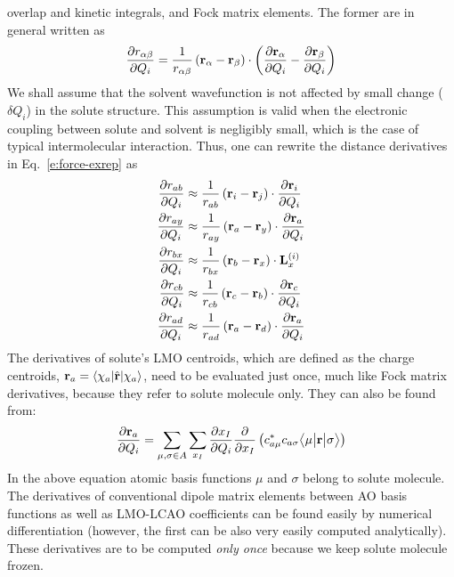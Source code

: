 \documentclass[b5paper,oneside,fleqn,11pt]{book}
\newcommand{\tbraket}[3]{\ensuremath{\bigl\langle {#1} \bigl\lvert {#2} \bigl\lvert {#3} \bigr\rangle}}
\newcommand{\fderiv}[2]{\ensuremath{
    \frac{\partial #1}{\partial #2}}}
\begin{document}
\begin{refsection}
overlap and kinetic integrals, and Fock matrix elements. The former 
are in general written as 
%
\begin{equation}\label{e:dr}
\fderiv{r_{\alpha\beta}}{Q_i} = 
\frac{1}{r_{\alpha\beta}} 
\left( {\bf r}_\alpha - {\bf r}_\beta \right) \cdot
\left( \fderiv{{\bf r}_\alpha}{Q_i} - \fderiv{{\bf r}_\beta}{Q_i} \right)
\end{equation}
%
We shall assume that the solvent wavefunction is not affected 
by small change ($\delta Q_i$) in the solute structure. This assumption 
is valid when the electronic coupling between solute and 
solvent is negligibly small, which is the case of typical 
intermolecular interaction. Thus, one can rewrite 
the distance derivatives in Eq.~\eqref{e:force-exrep} as
%
\begin{subequations}
\begin{align}
\fderiv{r_{ab}}{Q_i} &\approx \frac{1}{r_{ab}} 
\left( {\bf r}_i - {\bf r}_j \right) \cdot
\fderiv{{\bf r}_i}{Q_i} \\
\fderiv{r_{ay}}{Q_i} &\approx \frac{1}{r_{ay}} 
\left( {\bf r}_a - {\bf r}_y \right) \cdot
\fderiv{{\bf r}_a}{Q_i} \\
\fderiv{r_{bx}}{Q_i} &\approx \frac{1}{r_{bx}} 
\left( {\bf r}_b - {\bf r}_x \right) \cdot
{\bf L}_x^{(i)} \\
\fderiv{r_{cb}}{Q_i} &\approx \frac{1}{r_{cb}} 
\left( {\bf r}_c - {\bf r}_b \right) \cdot
\fderiv{{\bf r}_c}{Q_i} \\
\fderiv{r_{ad}}{Q_i} &\approx \frac{1}{r_{ad}} 
\left( {\bf r}_a - {\bf r}_d \right) \cdot
\fderiv{{\bf r}_a}{Q_i}
\end{align}
\end{subequations}
%
The derivatives of solute's LMO centroids, which are defined as 
the charge centroids, ${\bf r}_a=\langle \chi_a\lvert\hat{\bf r}\rvert\chi_a\rangle$, 
need to be evaluated just once, 
much like Fock matrix derivatives, because they refer to solute 
molecule only. They can also be found from:
%
\begin{equation}\label{e:ddfg7676s2}
\fderiv{{\bf r}_a}{Q_i} = 
\sum_{\mu,\sigma \in A}\sum_{x_I}
\fderiv{x_I}{Q_i} \fderiv{}{x_I} 
\left( c_{a\mu}^* c_{a\sigma} \tbraket{\mu}{{\bf r}}{\sigma}\right)
\end{equation}
%
In the above equation atomic basis functions $\mu$ and $\sigma$ 
belong to solute molecule. The derivatives of conventional dipole
matrix elements between AO basis functions as well as LMO-LCAO
coefficients can be found easily by numerical differentiation
(however, the first can be also very easily computed analytically).
These derivatives are to be computed \emph{only once} because
we keep solute molecule frozen.%


\end{refsection}
\end{document}
